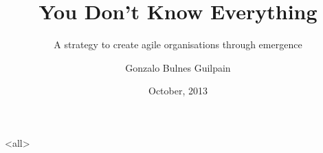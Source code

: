 \documentclass[ignorenonframetext]{beamer}
\author{Gonzalo Bulnes Guilpain}
\title[You Don't Know Everything]{You Don't Know Everything}
\subtitle{A strategy to create agile organisations through emergence}
\institute{Acid Labs, Santiago, Chile}
\date{October, 2013}
\begin{document}
  \mode<all>
  
  \mode*
\end{document}
